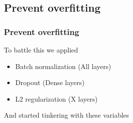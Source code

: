 \documentclass{beamer}
\begin{document}
\subsection{Prevent overfitting}
\begin{frame}
  \frametitle{Prevent overfitting}
  To battle this we applied
  \begin{itemize}
    \item Batch normalization (All layers)
    \item Dropout (Dense layers)
    \item L2 regularization (X layers)
  \end{itemize}
  And started tinkering with these variables
\end{frame}
\end{document}
